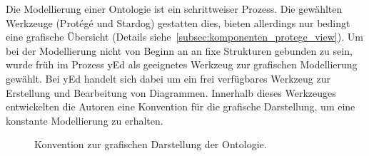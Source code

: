 Die Modellierung einer Ontologie ist ein schrittweiser Prozess. Die gewählten Werkzeuge (Protégé und Stardog) gestatten dies, bieten allerdings nur bedingt eine grafische Übersicht (Details siehe~\ref{subsec:komponenten_protege_view}). Um bei der Modellierung nicht von Beginn an an fixe Strukturen gebunden zu sein, wurde früh im Prozess yEd als geeignetes Werkzeug zur grafischen Modellierung gewählt. Bei yEd handelt sich dabei um ein frei verfügbares Werkzeug zur Erstellung und Bearbeitung von Diagrammen. Innerhalb dieses Werkzeuges entwickelten die Autoren eine Konvention für die grafische Darstellung, um eine konstante Modellierung zu erhalten.
\begin{figure}[H]
    \centering {}
    \caption{Konvention zur grafischen Darstellung der Ontologie.\label{fig:vorgehen:grundlagen:technisch:yed}\protect\footnotemark}
\end{figure}

